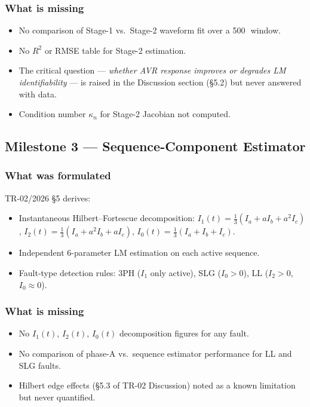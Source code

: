\documentclass[12pt,a4paper]{article}
\newcommand{\mss}{\,\text{ms}}
\begin{document}
\subsubsection{What is missing}
\begin{itemize}
  \item No comparison of Stage-1 vs.\ Stage-2 waveform fit over a 500\mss\
        window.
  \item No $R^2$ or RMSE table for Stage-2 estimation.
  \item The critical question --- \emph{whether AVR response improves or
        degrades LM identifiability} --- is raised in the Discussion section
        (\S5.2) but never answered with data.
  \item Condition number $\kappa_n$ for Stage-2 Jacobian not computed.
\end{itemize}

\subsection{Milestone 3 — Sequence-Component Estimator}
\label{sec:gap:m3}

\subsubsection{What was formulated}

TR-02/2026 \S5 derives:
\begin{itemize}
  \item Instantaneous Hilbert--Fortescue decomposition:
        $I_1(t) = \tfrac{1}{3}(I_a + a I_b + a^2 I_c)$,
        $I_2(t) = \tfrac{1}{3}(I_a + a^2 I_b + a I_c)$,
        $I_0(t) = \tfrac{1}{3}(I_a + I_b + I_c)$.
  \item Independent 6-parameter LM estimation on each active sequence.
  \item Fault-type detection rules: 3PH ($I_1$ only active), SLG ($I_0 > 0$),
        LL ($I_2 > 0$, $I_0 \approx 0$).
\end{itemize}

\subsubsection{What is missing}
\begin{itemize}
  \item No $I_1(t)$, $I_2(t)$, $I_0(t)$ decomposition figures for any fault.
  \item No comparison of phase-A vs.\ sequence estimator performance for
        LL and SLG faults.
  \item Hilbert edge effects (\S5.3 of TR-02 Discussion) noted as a known
        limitation but never quantified.
\end{itemize}
\end{document}
